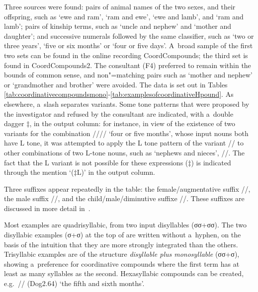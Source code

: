 Three sources were found: pairs of animal names of the two sexes, and their offspring, such as ‘ewe
and ram’, ‘ram and ewe’, ‘ewe and lamb’, and ‘ram and lamb’; pairs of kinship terms, such as ‘uncle
and nephew’ and ‘mother and daughter’; and successive numerals followed by the same classifier, such
as ‘two or three years’, ‘five or six months’ or ‘four or five days’. A~broad sample of the first
two sets can be found in the online recording CoordCompounds; the third set is found in
CoordCompounds2. The consultant (F4) preferred to remain within the bounds of common
sense, and non"=matching pairs such as ‘mother and nephew’ or ‘grandmother and brother’
were avoided. The data is set out in Tables \ref{tab:coordinativecompoundsmono}-\ref{tab:examplesofcoordinativeHpound}. As elsewhere, a~slash separates
variants. Some tone patterns that were proposed by the investigator and refused by the consultant
are indicated, with a~double dagger $\ddagger$, in the output column: for instance, in view of the existence of two
variants for the combination //{\kern2pt}// ‘four or five months’, whose input nouns both have L tone, it was attempted to apply the L tone pattern of the variant // to other combinations of two L-tone nouns, such as
‘nephews and nieces’, //. The fact that the L {variant} is not possible for these
expressions ($\ddagger${\kern2pt}) is indicated through the mention ‘($\ddagger${\kern2pt}L)’ in the output column.

Three suffixes appear repeatedly in the table: the female/{\allowbreak}{augmentative} suffix //, the male
suffix //, and the child/{\allowbreak}male/{\allowbreak}{diminutive} suffixe //. These suffixes are discussed in more detail in~.

Most examples are quadrisyllabic, from two input disyllables (σσ+σσ). The two disyllabic examples
(σ+σ) at the top of  are written without a~hyphen, on the basis of the intuition that
they are more strongly integrated than the others. Trisyllabic examples are of the structure
\textit{disyllable plus monosyllable} (σσ+σ), showing a~preference for coordinative compounds
where the first term has at least as many syllables as the second. Hexasyllabic compounds can be
created, e.g.~// (Dog2.64) ‘the fifth and sixth months’. 

